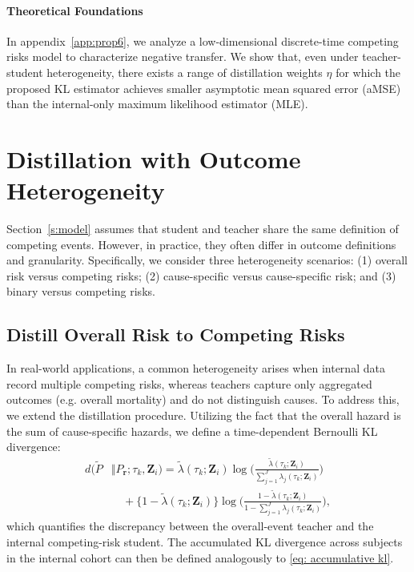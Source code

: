 \documentclass{article}
\theoremstyle{plain}
\theoremstyle{definition}
\theoremstyle{remark}
\begin{document}
\paragraph{Theoretical Foundations}  
In appendix~\ref{app:prop6}, we analyze a low-dimensional discrete-time competing risks model to characterize negative transfer. We show that, even under teacher-student heterogeneity, there exists a range of distillation weights $\eta$ for which the proposed KL estimator achieves smaller asymptotic mean squared error (aMSE)  than the internal-only maximum likelihood estimator (MLE). 

\section{Distillation with Outcome Heterogeneity}

Section~\ref{s:model} assumes that student and teacher share the same definition of competing events. However, in practice, they often differ in outcome definitions and granularity. Specifically, we consider three heterogeneity scenarios: (1) overall risk versus competing risks; (2) cause-specific versus cause-specific risk; and (3) binary versus competing risks.

\subsection{Distill Overall Risk to Competing Risks}
In real-world applications, a common heterogeneity arises when internal data record multiple competing risks, whereas teachers capture only aggregated outcomes (e.g. overall mortality) and do not distinguish causes. To address this, we extend the distillation procedure. Utilizing the fact that the overall hazard is the sum of cause-specific hazards, we define a time-dependent Bernoulli KL divergence:
\begin{align*}
d(\tilde P &\Vert P_{\boldsymbol r}; \tau_k, \bm Z_i)
=
\tilde{\lambda}(\tau_k;\bm Z_i)
\log\!\Biggl(
\frac{\tilde{\lambda}(\tau_k;\bm Z_i)}
     {\sum_{j=1}^J \lambda_j(\tau_k;\bm Z_i)}
\Biggr)
\\
&\quad+
\bigl\{1-\tilde{\lambda}(\tau_k;\bm Z_i)\bigr\}
\log\!\Biggl(
\frac{1-\tilde{\lambda}(\tau_k;\bm Z_i)}
     {1-\sum_{j=1}^J \lambda_j(\tau_k;\bm Z_i)}
\Biggr),
\end{align*}
which quantifies the discrepancy between the overall-event teacher and the internal competing-risk student. The accumulated KL divergence across subjects in the internal cohort can then be defined analogously to \eqref{eq: accumulative kl}. 
\end{document}

